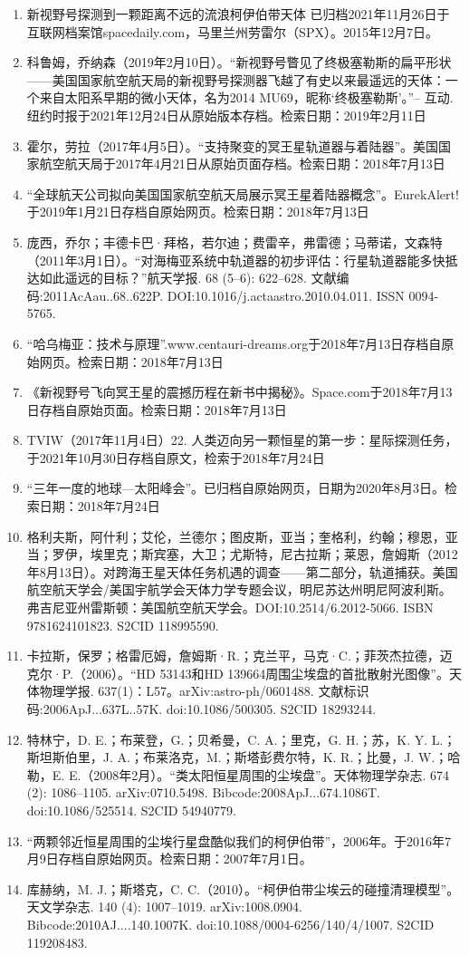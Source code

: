\begin{enumerate}
\item 新视野号探测到一颗距离不远的流浪柯伊伯带天体 已归档2021年11月26日于互联网档案馆spacedaily.com，马里兰州劳雷尔（SPX）。2015年12月7日。
\item 科鲁姆，乔纳森（2019年2月10日）。“新视野号瞥见了终极塞勒斯的扁平形状——美国国家航空航天局的新视野号探测器飞越了有史以来最遥远的天体：一个来自太阳系早期的微小天体，名为2014 MU69，昵称‘终极塞勒斯’。”– 互动.纽约时报于2021年12月24日从原始版本存档。检索日期：2019年2月11日
\item 霍尔，劳拉（2017年4月5日）。“支持聚变的冥王星轨道器与着陆器”。美国国家航空航天局于2017年4月21日从原始页面存档。检索日期：2018年7月13日
\item “全球航天公司拟向美国国家航空航天局展示冥王星着陆器概念”。EurekAlert!于2019年1月21日存档自原始网页。检索日期：2018年7月13日
\item 庞西，乔尔；丰德卡巴·拜格，若尔迪；费雷辛，弗雷德；马蒂诺，文森特（2011年3月1日）。“对海梅亚系统中轨道器的初步评估：行星轨道器能多快抵达如此遥远的目标？”航天学报. 68 (5–6): 622–628. 文献编码:2011AcAau..68..622P. DOI:10.1016/j.actaastro.2010.04.011. ISSN 0094-5765.
\item “哈乌梅亚：技术与原理”.www.centauri-dreams.org于2018年7月13日存档自原始网页。检索日期：2018年7月13日
\item 《新视野号飞向冥王星的震撼历程在新书中揭秘》。Space.com于2018年7月13日存档自原始页面。检索日期：2018年7月13日
\item TVIW（2017年11月4日）22. 人类迈向另一颗恒星的第一步：星际探测任务，于2021年10月30日存档自原文，检索于2018年7月24日
\item “三年一度的地球—太阳峰会”。已归档自原始网页，日期为2020年8月3日。检索日期：2018年7月24日
\item 格利夫斯，阿什利；艾伦，兰德尔；图皮斯，亚当；奎格利，约翰；穆恩，亚当；罗伊，埃里克；斯宾塞，大卫；尤斯特，尼古拉斯；莱恩，詹姆斯（2012年8月13日）。对跨海王星天体任务机遇的调查——第二部分，轨道捕获。美国航空航天学会/美国宇航学会天体力学专题会议，明尼苏达州明尼阿波利斯。弗吉尼亚州雷斯顿：美国航空航天学会。DOI:10.2514/6.2012-5066. ISBN 9781624101823. S2CID 118995590.
\item 卡拉斯，保罗；格雷厄姆，詹姆斯·R.；克兰平，马克·C.；菲茨杰拉德，迈克尔·P.（2006）。“HD 53143和HD 139664周围尘埃盘的首批散射光图像”。天体物理学报. 637(1)：L57。arXiv:astro-ph/0601488. 文献标识码:2006ApJ...637L..57K. doi:10.1086/500305. S2CID 18293244.
\item 特林宁，D. E.；布莱登，G.；贝希曼，C. A.；里克，G. H.；苏，K. Y. L.；斯坦斯伯里，J. A.；布莱洛克，M.；斯塔彭费尔特，K. R.；比曼，J. W.；哈勒，E. E.（2008年2月）。“类太阳恒星周围的尘埃盘”。天体物理学杂志. 674 (2): 1086–1105. arXiv:0710.5498. Bibcode:2008ApJ...674.1086T. doi:10.1086/525514. S2CID 54940779.
\item “两颗邻近恒星周围的尘埃行星盘酷似我们的柯伊伯带”，2006年。于2016年7月9日存档自原始网页。检索日期：2007年7月1日。
\item 库赫纳，M. J.；斯塔克，C. C.（2010）。“柯伊伯带尘埃云的碰撞清理模型”。天文学杂志. 140 (4): 1007–1019. arXiv:1008.0904. Bibcode:2010AJ....140.1007K. doi:10.1088/0004-6256/140/4/1007. S2CID 119208483.
\end{enumerate}
